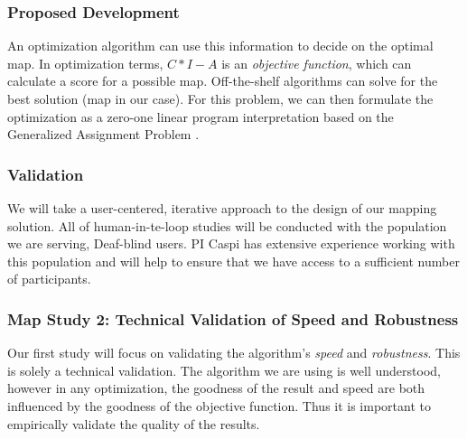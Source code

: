 

\subsubsection{Proposed Development}

An optimization algorithm can use this information to decide on the optimal map. In optimization terms, $C*I-A$ is an \textit{objective function}, which can calculate a score for a possible map. Off-the-shelf algorithms can solve for the best solution (map in our case). For this problem, we can then  formulate the optimization as a zero-one linear program interpretation based on the Generalized Assignment Problem 
\cite{kuhn1955hungarian}. 

\subsubsection{Validation}
We will take a user-centered, iterative approach to the design of our mapping solution. All of human-in-te-loop studies will be conducted with the population we are serving, Deaf-blind users. PI Caspi has extensive experience working with this population  and will  help to ensure that we have access to a sufficient number of participants.  

\subsubsection{Map Study 2: Technical Validation of Speed and Robustness}
\label{sec:technical-validation}
Our first study will focus on validating the algorithm's {\em speed} and {\em robustness}. This is solely a technical validation. The algorithm we are using is well understood, however in any optimization, the goodness of the result and speed are both influenced by the goodness of the objective function. Thus it is important to empirically validate the quality of the results.

